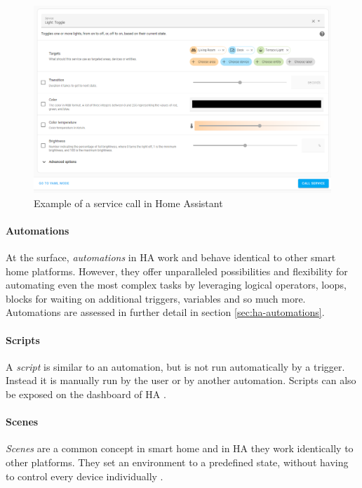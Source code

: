 \begin{figure}[H]
    \centering
    \includegraphics[width=.95\linewidth]{img/ha-service-calls.png}
    \caption{Example of a service call in Home Assistant}
    \label{fig:HA-Service-Calls}
\end{figure}

\paragraph{Automations}
At the surface, \textit{automations} in HA work and behave identical to other smart home platforms. However, they offer unparalleled possibilities and flexibility for automating even the most complex tasks by leveraging logical operators, loops, blocks for waiting on additional triggers, variables and so much more. Automations are assessed in further detail in section \ref{sec:ha-automations}.

\paragraph{Scripts}
A \textit{script} is similar to an automation, but is not run automatically by a trigger. Instead it is manually run by the user or by another automation. Scripts can also be exposed on the dashboard of HA \cite{HomeAssistant_Docs_Concepts}. 

\paragraph{Scenes}
\textit{Scenes} are a common concept in smart home and in HA they work identically to other platforms. They set an environment to a predefined state, without having to control every device individually \cite{HomeAssistant_Docs_Concepts}. 

